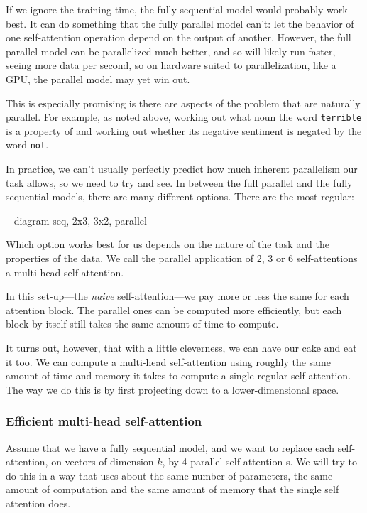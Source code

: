 \documentclass{pca}
\theoremstyle{theorem}
\theoremstyle{definition}
\theoremstyle{proof}
\begin{document}
If we ignore the training time, the fully sequential model would probably work best. It can do something that the fully parallel model can't: let the behavior of one self-attention operation depend on the output of another. However, the full parallel model can be parallelized much better, and so will likely run faster, seeing more data per second, so on  hardware suited to parallelization, like a GPU, the parallel model may yet win out. 

This is especially promising is there are aspects of the problem that are naturally parallel. For example, as noted above, working out what noun the word \texttt{terrible} is a property of and working out whether its negative sentiment is negated by the word \texttt{not}.

In practice, we can't usually perfectly predict how much inherent parallelism our task allows, so we need to try and see. In between the full parallel and the fully sequential models, there are many different options. There are the most regular:

-- diagram seq, 2x3, 3x2, parallel

Which option works best for us depends on the nature of the task and the properties of the data. We call the parallel application of 2, 3 or 6 self-attentions a multi-head self-attention.

In this set-up---the \emph{naive} self-attention---we pay more or less the same for each attention block. The parallel ones can be computed more efficiently, but each block by itself still takes the same amount of time to compute. 

It turns out, however, that with a little cleverness, we can have our cake and eat it too. We can compute a multi-head self-attention using roughly the same amount of time and memory it takes to compute a single regular self-attention. The way we do this is by first projecting down to a lower-dimensional space. 

\subsubsection{Efficient multi-head self-attention}

Assume that we have a fully sequential model, and we want to replace each self-attention, on vectors of dimension $k$, by 4 parallel self-attention s. We will try to do this in a way that uses about the same number of parameters, the same amount of computation and the same amount of memory that the single self attention does.
\end{document}
